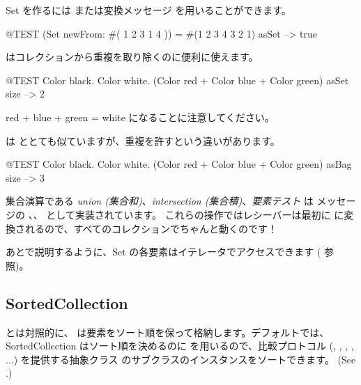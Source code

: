 \documentclass[a4paper,10pt,twoside]{book}
\begin{document}
Set を作るには  または変換メッセージ  を用いることができます。

\begin{code}{@TEST}
(Set newFrom: #( 1 2 3 1 4 )) = #(1 2 3 4 3 2 1) asSet --> true
\end{code}

 はコレクションから重複を取り除くのに便利に使えます。
\begin{code}{@TEST}
{ Color black. Color white. (Color red + Color blue + Color green) } asSet size --> 2
\end{code}
\noindent
red + blue + green = white になることに注意してください。

 は  ととても似ていますが、重複を許すという違いがあります。
\begin{code}{@TEST}
{ Color black. Color white. (Color red + Color blue + Color green) } asBag size --> 3
\end{code}

集合演算である \emph{union (集合和)}、\emph{intersection (集合積)}、\emph{要素テスト} は  メッセージの 、、 として実装されています。
これらの操作ではレシーバーは最初に  に変換されるので、すべてのコレクションでちゃんと動くのです！


あとで説明するように、Set の各要素はイテレータでアクセスできます ( 参照)。

\subsection{SortedCollection}
 とは対照的に、 は要素をソート順を保って格納します。デフォルトでは、SortedCollection はソート順を決めるのに  を用いるので、比較プロトコル (, , , , ...) を提供する抽象クラス  のサブクラスのインスタンスをソートできます。
(See .)
\end{document}
